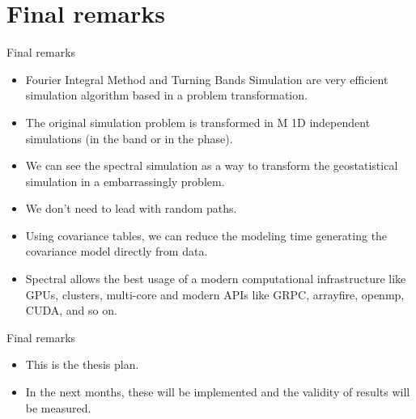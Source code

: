 \section{Final remarks}
\begin{frame}{Final remarks}
\begin{itemize}
	\item Fourier Integral Method and Turning Bands Simulation are very efficient simulation algorithm based in a problem transformation.
    \item The original simulation problem is transformed in M 1D independent simulations (in the band or in the phase).
    \item We can see the spectral simulation as a way to transform the geostatistical simulation in a embarrassingly problem. 
    \item We don't need to lead with random paths.
    \item Using covariance tables, we can reduce the modeling time generating the covariance model directly from data.
    \item Spectral allows the best usage of a modern computational infrastructure like GPUs, clusters, multi-core and modern APIs like GRPC, arrayfire, openmp, CUDA, and so on.
\end{itemize}
\end{frame}


\begin{frame}{Final remarks}
\begin{itemize}
	\item This is the thesis plan.
    \item In the next months, these will be implemented and the validity of results will be measured. 
\end{itemize}
\end{frame}




